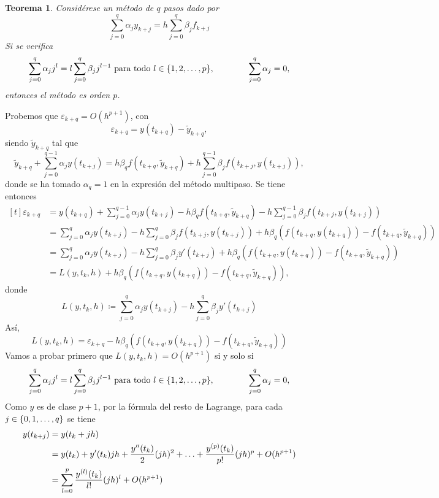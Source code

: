 \documentclass[11pt]{report}
\makeatletter
\renewenvironment{proof}[1][\proofname]{\par
  \pushQED{\qed}%
  \normalfont \topsep\z@skip %
  \trivlist
  \item[\hskip\labelsep
        \itshape
    #1\@addpunct{.}]\ignorespaces
}{%
  \popQED\endtrivlist\@endpefalse
}
\theoremstyle{mytheorem}
\newtheorem{theorem}{Teorema}
\theoremstyle{mydefinition}
\theoremstyle{myexample}
\let\oldproofname=\proofname
\renewcommand{\proofname}{\rm\bf{\oldproofname}}}
\newenvironment{ctheorem} %
  {\begin{mdframed}[
        linewidth=3pt,
        linecolor=c2,
        bottomline=false,
        topline=false,
        rightline=false,
        innerrightmargin=0pt,
        innertopmargin=0pt,
        innerbottommargin=0pt,
        innerleftmargin=1em, %
        skipabove=\baselineskip]
    \begin{theorem}}
  {\end{theorem}\end{mdframed}}
\makeatother
\begin{document}
\begin{ctheorem}
Considérese un método de $q$ pasos dado por
\[\sum_{j=0}^q \alpha_j y_{k+j} = h\sum_{j=0}^q \beta_j f_{k+j}\]
Si se verifica
\[\sum_{j=0}^q \alpha_j j^l = l \sum_{j=0}^q \beta_j j^{l-1} \textup{ para todo } l \in \{1,2,\mathellipsis,p\}, \qquad \qquad \sum_{j=0}^q \alpha_j = 0,\]
entonces el método es orden $p$.
\end{ctheorem}

\begin{proof}
Probemos que $\varepsilon_{k+q} = O(h^{p+1})$, con
\[\varepsilon_{k+q} = y(t_{k+q})-\widetilde{y}_{k+q},\]
siendo $\widetilde{y}_{k+q}$ tal que
\[\widetilde{y}_{k+q} +\sum_{j=0}^{q-1}\alpha_jy(t_{k+j}) = h\beta_qf(t_{k+q},\widetilde{y}_{k+q})+h\sum_{j=0}^{q-1}\beta_jf(t_{k+j},y(t_{k+j})),\]
donde se ha tomado $\alpha_q = 1$ en la expresión del método multipaso. Se tiene entonces
\[\begin{aligned}[t]
    \varepsilon_{k+q} &= y(t_{k+q}) +\sum_{j=0}^{q-1}\alpha_jy(t_{k+j})-h\beta_qf(t_{k+q},\widetilde{y}_{k+q})-h\sum_{j=0}^{q-1}\beta_jf(t_{k+j},y(t_{k+j})) \\
    &=\sum_{j=0}^{q}\alpha_jy(t_{k+j})-h\sum_{j=0}^{q}\beta_jf(t_{k+j},y(t_{k+j}))+h\beta_q\left(f(t_{k+q},y(t_{k+q}))-f(t_{k+q},\widetilde{y}_{k+q})\right) \\
    &=\sum_{j=0}^{q}\alpha_jy(t_{k+j})-h\sum_{j=0}^{q}\beta_jy'(t_{k+j})+h\beta_q\left(f(t_{k+q},y(t_{k+q}))-f(t_{k+q},\widetilde{y}_{k+q})\right) \\
    &=L(y,t_k,h)+h\beta_q\left(f(t_{k+q},y(t_{k+q}))-f(t_{k+q},\widetilde{y}_{k+q})\right),
\end{aligned}\]
donde
\[L(y,t_k,h)\coloneqq \sum_{j=0}^{q}\alpha_jy(t_{k+j})-h\sum_{j=0}^{q}\beta_jy'(t_{k+j})\]
Así,
\[L(y,t_k,h) = \varepsilon_{k+q}-h\beta_q\left(f(t_{k+q},y(t_{k+q}))-f(t_{k+q},\widetilde{y}_{k+q})\right)\]
Vamos a probar primero que $L(y,t_k,h) = O(h^{p+1})$ si y solo si 
\[\sum_{j=0}^q \alpha_j j^l = l \sum_{j=0}^q \beta_j j^{l-1} \textup{ para todo } l \in \{1,2,\mathellipsis,p\}, \qquad \qquad \sum_{j=0}^q \alpha_j = 0,\]
Como $y$ es de clase $p+1$, por la fórmula del resto de Lagrange, para cada $j \in \{0,1,\mathellipsis,q\}$ se tiene
\[
\begin{aligned}[t]
    y(t_{k+j}) &=y(t_k+jh)\\
    &= y(t_k)+y'(t_k)jh+\frac{y''(t_k)}{2}(jh)^2+\mathellipsis+\frac{y^{(p)}(t_k)}{p!}(jh)^p+O(h^{p+1}) \\
    &= \sum_{l=0}^p  \frac{y^{(l)}(t_k)}{l!}(jh)^l +O(h^{p+1})
\end{aligned}
\]
\end{proof}
\end{document}
